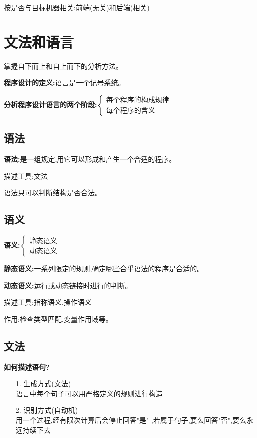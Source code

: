 \documentclass[UTF8,a4paper]{ctexart}
\newcommand{\spaceline}{\vspace{\baselineskip}}
\begin{document}
    按是否与目标机器相关:前端(无关)和后端(相关)

  \section{文法和语言}

  掌握自下而上和自上而下的分析方法。

  \spaceline
  \textbf{程序设计的定义:}语言是一个记号系统。

  \textbf{分析程序设计语言的两个阶段:}$\left \{\begin{array}{l} \text{每个程序的构成规律}\\\text{每个程序的含义}\end{array} \right .$

    \subsection{语法}
    \textbf{语法:}是一组规定,用它可以形成和产生一个合适的程序。

    描述工具:文法

    语法只可以判断结构是否合法。

    \subsection{语义}
    \textbf{语义:}$\left \{ \begin{array}{l}\text{静态语义}\\\text{动态语义} \end{array} \right.$

    \spaceline

    \textbf{静态语义:}一系列限定的规则,确定哪些合乎语法的程序是合适的。

    \textbf{动态语义:}运行或动态链接时进行的判断。

    描述工具:指称语义,操作语义

    作用:检查类型匹配,变量作用域等。

    \subsection{文法}
    \textbf{如何描述语句?}
    \begin{itemize}
      \item [1.] 生成方式(文法)\\
      语言中每个句子可以用严格定义的规则进行构造
      \item [2.] 识别方式(自动机)\\
      用一个过程,经有限次计算后会停止回答"是" ,若属于句子,要么回答"否",要么永远持续下去
    \end{itemize}
\end{document}
